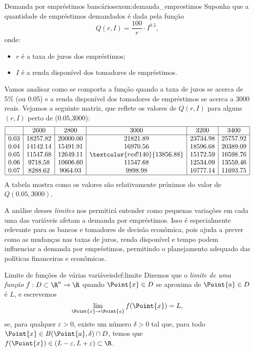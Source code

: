 \begin{example}{Demanda por empréstimos bancários}{exem:demanda_emprestimos}
Suponha que a quantidade de empréstimos demandados é dada pela função
\[ Q(r, I) = \frac{100}{r} \cdot I^{0.5}, \]
onde:
\begin{itemize}[label=\color{examplescolor}\textbullet]
\item \( r \) é a taxa de juros dos empréstimos;
\item \( I \) é a renda disponível dos tomadores de empréstimos. 
\end{itemize}

Vamos analisar como se comporta a função quando a taxa de juros se acerca de 5\% (ou 0.05) e a renda disponível dos tomadores de empréstimos se acerca a 3000 reais. Vejamos a seguinte matriz, que reflete os valores de \(Q(r, I)\) para alguns $(r,I)$ perto de (0.05,3000):
\[
\begin{array}{|c|c|c|c|c|c|}
\hline
 & 2600 & 2800 & 3000 & 3200 & 3400 \\
\hline
0.03 & 18257.82 & 20000.00 & 21821.89 & 23734.98 & 25757.92 \\
0.04 & 14142.14 & 15491.91 & 16970.56 & 18596.68 & 20389.09 \\
0.05 & 11547.68 & 12649.11 & \textcolor{red!140}{13856.88} & 15172.59 & 16598.76 \\
0.06 & 9718.58 & 10606.60 & 11547.68 & 12534.09 & 13559.46 \\
0.07 & 8288.62 & 9064.03 & 9898.98 & 10777.14 & 11693.75 \\
\hline
\end{array}
\]
A tabela mostra como os valores são relativamente próximos do valor de $Q(0.05,3000)$. 
\end{example}


A análise desses \textit{limites} nos permitirá entender como pequenas variações em cada uma das variáveis afetam a demanda por empréstimos. Isso é especialmente relevante para os bancos e tomadores de decisão econômica, pois ajuda a prever como as mudanças nas taxas de juros, renda disponível e tempo podem influenciar a demanda por empréstimos, permitindo o planejamento adequado das políticas financeiras e econômicas.


\begin{definition}{Limite de funções de várias variáveis}{def:limite}
Dizemos que o \textit{limite de uma função} $f:D\subset\R^n\to \R$ quando $\Point{x}\in D$ se aproxima de $\Point{a}\in D$ é $L$, e escrevemos
\[
\lim\limits_{{\Point{x} \to \Point{a}}} f(\Point{x}) = L,
\]
se, para qualquer $\varepsilon>0$, existe um número $\delta>0$ tal que, para todo $\Point{x}\in B(\Point{a},\delta) \cap D$, temos que 
$f(\Point{x})\in (L-\varepsilon,L+\varepsilon)\subset \R $.
\end{definition}


